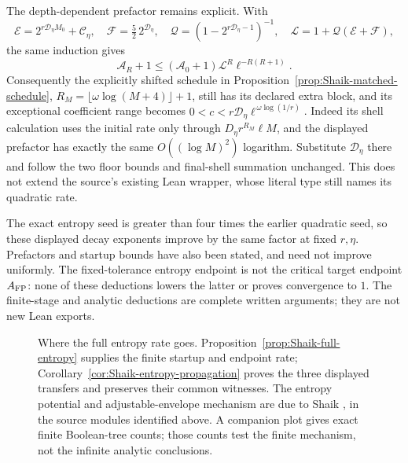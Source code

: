 The depth-dependent prefactor remains explicit. With
\[
 \mathcal E=2^{r\mathcal D_\eta M_0}+\mathcal C_\eta,\quad
 \mathcal F=\tfrac52\,2^{\mathcal D_\eta},\quad
 \mathcal Q=(1-2^{r\mathcal D_\eta-1})^{-1},\quad
 \mathcal L=1+\mathcal Q(\mathcal E+\mathcal F),
\]
the same induction gives
\[
 \mathcal A_R+1\le
   (\mathcal A_0+1)\mathcal L^R\ell^{-R(R+1)}.
\]
Consequently the explicitly shifted schedule in
Proposition~\ref{prop:Shaik-matched-schedule},
\(R_M=\lfloor\omega\log(M+4)\rfloor+1\),
still has its declared extra block, and its exceptional coefficient
range becomes
\(0<c<r\mathcal D_\eta\ell^{\,\omega\log(1/r)}\).
Indeed its shell calculation uses the initial rate only through
\(D_\eta r^{R_M}\ell M\), and the displayed prefactor has exactly
the same \(O((\log M)^2)\) logarithm. Substitute \(\mathcal D_\eta\)
there and follow the two floor bounds and final-shell summation
unchanged. This does not extend the source's existing Lean wrapper,
whose literal type still names its quadratic rate.

The exact entropy seed is greater than four times the earlier
quadratic seed, so these displayed decay exponents improve by the
same factor at fixed \(r,\eta\). Prefactors and startup bounds have
also been stated, and need not improve uniformly.
The fixed-tolerance entropy endpoint is not the critical target
endpoint \(A_{\rm FP}\): none of these deductions lowers the
latter or proves convergence to \(1\).
The finite-stage and analytic deductions are complete written
arguments; they are not new Lean exports.

\begin{figure}[ht]
\centering
{}
\caption{Where the full entropy rate goes.
Proposition~\ref{prop:Shaik-full-entropy} supplies the finite startup
and endpoint rate; Corollary~\ref{cor:Shaik-entropy-propagation}
proves the three displayed transfers and preserves their common witnesses.
The entropy potential and adjustable-envelope mechanism are due to
Shaik \cite{Shaik2026v324}, in the source modules identified above.
A companion plot gives exact finite Boolean-tree counts; those counts
test the finite mechanism, not the infinite analytic conclusions.}
\end{figure}

